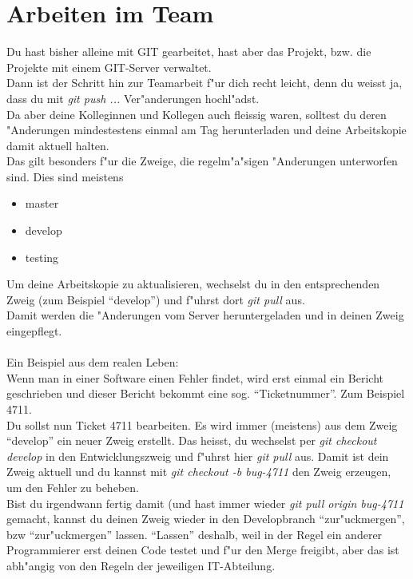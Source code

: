\documentclass[german,a4paper]{report}
\begin{document}
\chapter{Arbeiten im Team}
Du hast bisher alleine mit GIT gearbeitet, hast aber das Projekt, bzw.
die Projekte mit einem GIT-Server verwaltet.\\
Dann ist der Schritt hin zur Teamarbeit f"ur dich recht leicht, denn
du weisst ja, dass du mit \textit{git push ...} Ver"anderungen
hochl"adst.\\
Da aber deine Kolleginnen und Kollegen auch fleissig waren, solltest
du deren "Anderungen  mindestestens einmal am Tag herunterladen
und deine Arbeitskopie damit aktuell halten.\\
Das gilt besonders f"ur die Zweige, die regelm"a"sigen "Anderungen
unterworfen sind. Dies sind meistens
\begin{itemize}
\item master
\item develop
\item testing
\end{itemize}
Um deine Arbeitskopie zu aktualisieren, wechselst du in den entsprechenden
Zweig (zum Beispiel ``develop'') und f"uhrst dort \textit{git pull} aus.\\
Damit werden die "Anderungen vom Server heruntergeladen und in deinen Zweig
eingepflegt.\\
\\
Ein Beispiel aus dem realen Leben:\\
Wenn man in einer Software einen Fehler findet, wird erst einmal ein
Bericht geschrieben und dieser Bericht bekommt eine sog. ``Ticketnummer''.
Zum Beispiel 4711.\\
Du sollst nun Ticket 4711 bearbeiten. Es wird immer (meistens) aus dem
Zweig ``develop'' ein neuer Zweig erstellt. Das heisst, du wechselst
per \textit{git checkout develop} in den Entwicklungszweig und
f"uhrst hier \textit{git pull} aus. Damit ist dein Zweig aktuell und
du kannst mit \textit{git checkout -b bug-4711} den Zweig erzeugen,
um den Fehler zu beheben.\\
Bist du irgendwann fertig damit (und hast immer wieder \textit{git
pull origin bug-4711} gemacht, kannst du deinen Zweig wieder in
den Developbranch ``zur"uckmergen'', bzw ``zur"uckmergen'' lassen.
``Lassen'' deshalb, weil in der Regel ein anderer Programmierer
erst deinen Code testet und f"ur den Merge freigibt, aber das ist
abh"angig von den Regeln der jeweiligen IT-Abteilung.
\end{document}

